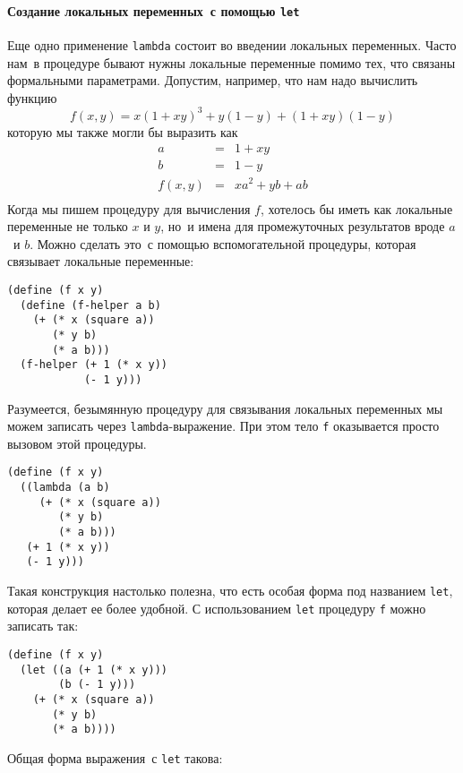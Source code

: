 \paragraph{Создание локальных переменных~с помощью {\tt let}}


Еще одно применение {\tt lambda} состоит во
введении 
локальных переменных.  Часто нам~в процедуре бывают нужны
локальные переменные помимо тех, что связаны формальными
параметрами.  Допустим, например, что нам надо вычислить функцию
$$
f (x,y) = x (1+xy)^3 + y(1-y) + (1+xy)(1-y)
$$
которую мы также могли бы выразить как
$$
\begin{array}{rcl}
  a & = & 1 + xy \\
  b & = & 1 - y \\
  f (x,y) & = & xa^2 + yb + ab \\
\end{array}
$$
Когда мы пишем процедуру для вычисления $f$, хотелось
бы иметь как локальные переменные не только $x$ и
$y$, но~и имена для промежуточных результатов вроде
$a$~и $b$.  Можно сделать это~с помощью
вспомогательной процедуры, которая связывает локальные переменные:

\begin{Verbatim}[fontsize=\small]
(define (f x y)
  (define (f-helper a b)
    (+ (* x (square a))
       (* y b)
       (* a b)))
  (f-helper (+ 1 (* x y)) 
            (- 1 y)))
\end{Verbatim}

Разумеется, безымянную процедуру для 
связывания локальных переменных мы можем записать через
{\tt lambda}-выражение.  При этом тело {\tt f}
оказывается просто вызовом этой процедуры.

\begin{Verbatim}[fontsize=\small]
(define (f x y)
  ((lambda (a b)
     (+ (* x (square a))
        (* y b)
        (* a b)))
   (+ 1 (* x y))
   (- 1 y)))
\end{Verbatim}
Такая конструкция настолько полезна, что есть особая форма под
названием {\tt let}, 
которая делает ее более удобной.  С
использованием {\tt let} процедуру {\tt f} можно
записать так:

\begin{Verbatim}[fontsize=\small]
(define (f x y)
  (let ((a (+ 1 (* x y)))
        (b (- 1 y)))
    (+ (* x (square a))
       (* y b)
       (* a b))))
\end{Verbatim} 
Общая форма выражения~с {\tt let} такова:

